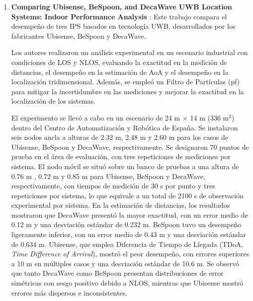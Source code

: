 \begin{enumerate}
    \item \textbf{Comparing Ubisense, BeSpoon, and DecaWave UWB Location Systems: Indoor Performance Analysis} \cite{Falcone2012}: Este trabajo compara el desempeño de tres IPS basados en tecnología UWB, desarrollados por los fabricantes Ubisense, BeSpoon y DecaWave.
    
    Los autores realizaron un análisis experimental en un escenario industrial con condiciones de LOS y NLOS, evaluando la exactitud en la medición de distancias, el desempeño en la estimación de AoA y el desempeño en la localización tridimensional. Además, se empleó un Filtro de Partículas (\gls{pf}) para mitigar la incertidumbre en las mediciones y mejorar la exactitud en la localización de los sistemas.

    El experimento se llevó a cabo en un escenario de 24 m $\times$ 14 m (336 m$^2$) dentro del Centro de Automatización y Robótica de España. Se instalaron seis nodos ancla a alturas de 2.32 m, 2.48 m y 2.60 m para los casos de Ubisense, BeSpoon y DecaWave, respectivamente. Se designaron 70 puntos de prueba en el área de evaluación, con tres repeticiones de mediciones por sistema. El nodo móvil se situó sobre un banco de pruebas a una altura de 0.76 m , 0.72 m y 0.85 m para Ubisense, BeSpoon y DecaWave, respectivamente, con tiempos de medición de 30 s por punto y tres repeticiones por sistema, lo que equivale a un total de 2100 s de observación experimental por sistema. En la estimación de distancias, los resultados mostraron que DecaWave presentó la mayor exactitud, con un error medio de 0.12 m y una desviación estándar de 0.232 m. BeSpoon tuvo un desempeño ligeramente inferior, con un error medio de 0.43 m y una desviación estándar de 0.634 m. Ubisense, que emplea Diferencia de Tiempo de Llegada (TDoA, \textit{Time Difference of Arrival}), mostró el peor desempeño, con errores superiores a 10 m en múltiples casos y una desviación estándar de 10.6 m. Se observó que tanto DecaWave como BeSpoon presentan distribuciones de error simétricas con sesgo positivo debido a NLOS, mientras que Ubisense mostró errores más dispersos e inconsistentes.


\end{enumerate}
